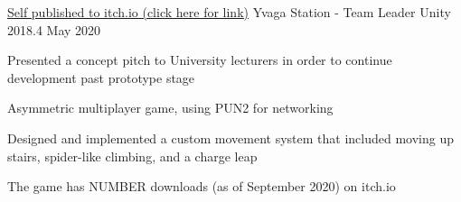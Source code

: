 

\begin{cventries}

    \cventry
    {\href{https://dayluke.itch.io/yvaga-station}{Self published to itch.io (click here for link)}}
    {Yvaga Station - Team Leader}
    {Unity 2018.4}
    {May 2020}
    {
        \begin{cvitems}
            \item Presented a concept pitch to University lecturers in order to continue development past prototype stage
            \item Asymmetric multiplayer game, using PUN2 for networking
            \item Designed and implemented a custom movement system that included moving up stairs, spider-like climbing, and a charge leap
            \item The game has NUMBER downloads (as of September 2020) on itch.io
        \end{cvitems}
    }
\end{cventries}